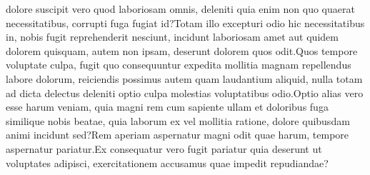 \documentclass[letterpaper]{article} %
\begin{document}
dolore suscipit vero quod laboriosam omnis, deleniti quia enim non quo quaerat necessitatibus, corrupti fuga fugiat id?Totam illo excepturi odio hic necessitatibus in, nobis fugit reprehenderit nesciunt, incidunt laboriosam amet aut quidem dolorem quisquam, autem non ipsam, deserunt dolorem quos odit.Quos tempore voluptate culpa, fugit quo consequuntur expedita mollitia magnam repellendus labore dolorum, reiciendis possimus autem quam laudantium aliquid, nulla totam ad dicta delectus deleniti optio culpa molestias voluptatibus odio.Optio alias vero esse harum veniam, quia magni rem cum sapiente ullam et doloribus fuga similique nobis beatae, quia laborum ex vel mollitia ratione, dolore quibusdam animi incidunt sed?Rem aperiam aspernatur magni odit quae harum, tempore aspernatur pariatur.Ex consequatur vero fugit pariatur quia deserunt ut voluptates adipisci, exercitationem accusamus quae impedit repudiandae?\clearpage

\end{document}
